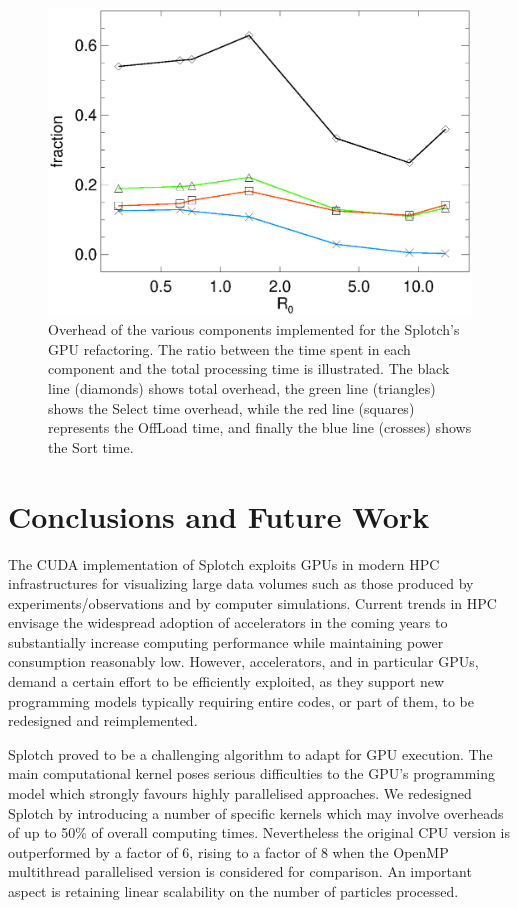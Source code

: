 \documentclass[smallextended]{svjour3}
\begin{document}
\begin{figure}
\includegraphics[scale=0.5]{over1.eps}
\caption{Overhead of the various components implemented for the Splotch's
GPU refactoring. The ratio between the time spent in each component and the total processing 
time is illustrated. The black line (diamonds) shows total overhead, the green line (triangles) shows the Select time overhead, while the red line (squares) represents the OffLoad time, and finally the blue line (crosses) shows the Sort time.}
\label{fig:over}
\end{figure}

\section{Conclusions and Future Work}
\label{sec:conclusions}
The CUDA implementation of Splotch exploits GPUs in modern HPC infrastructures for visualizing large data volumes such as those produced by experiments/observations and by computer simulations. Current trends in HPC envisage the widespread adoption of accelerators in the coming years to substantially increase computing performance while maintaining power consumption reasonably low. However, accelerators, and in particular GPUs, demand a certain effort to be efficiently exploited, as they support new programming models typically requiring entire codes, or part of them, to be redesigned and reimplemented.

Splotch proved to be a challenging algorithm to adapt for GPU execution. The main computational kernel poses serious difficulties to the GPU's programming model which strongly favours highly parallelised approaches. We redesigned Splotch by introducing a number of specific kernels which may involve overheads of up to 50\% of overall computing times. Nevertheless the original CPU
version is outperformed by a factor of 6, rising to a factor of 8 when the OpenMP multithread parallelised version is considered for comparison. An important aspect is retaining linear scalability on the number of particles processed.
\end{document}
